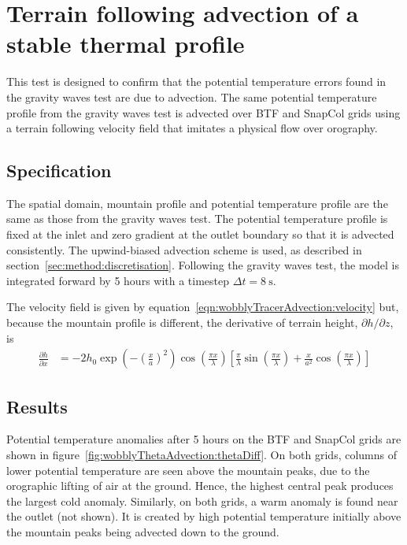 \section{Terrain following advection of a stable thermal profile}
\label{sec:wobblyThetaAdvection}

This test is designed to confirm that the potential temperature errors found in the gravity waves test are due to advection.  The same potential temperature profile from the gravity waves test is advected over BTF and SnapCol grids using a terrain following velocity field that imitates a physical flow over orography.

\subsection{Specification}
The spatial domain, mountain profile and potential temperature profile are the same as those from the gravity waves test.  The potential temperature profile is fixed at the inlet and zero gradient at the outlet boundary so that it is advected consistently.  The upwind-biased advection scheme is used, as described in section~\ref{sec:method:discretisation}.  Following the gravity waves test, the model is integrated forward by 5 hours with a timestep $\Delta t = \SI{8}{\second}$. 

The velocity field is given by equation~\ref{eqn:wobblyTracerAdvection:velocity} but, because the mountain profile is different, the derivative of terrain height, $\partial h / \partial z$, is
\begin{align}
\frac{\partial h}{\partial x} &= - 2 h_0 \exp \left( - \left( \frac{x}{a} \right)^2 \right) \cos \left( \frac{\pi x}{\lambda} \right) \left[
\frac{\pi}{\lambda} \sin \left(\frac{\pi x}{\lambda} \right) +
\frac{x}{a^2} \cos \left( \frac{\pi x}{\lambda} \right) \right]
\end{align}

\subsection{Results}
Potential temperature anomalies after 5 hours on the BTF and SnapCol grids are shown in figure~\ref{fig:wobblyThetaAdvection:thetaDiff}.  On both grids, columns of lower potential temperature are seen above the mountain peaks, due to the orographic lifting of air at the ground.  Hence, the highest central peak produces the largest cold anomaly.  Similarly, on both grids, a warm anomaly is found near the outlet (not shown).  It is created by high potential temperature initially above the mountain peaks being advected down to the ground.


